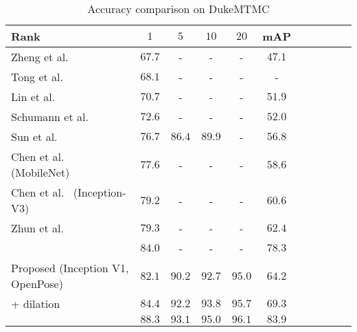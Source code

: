\documentclass{llncs}
\begin{document}
\begin{table}[t]
\setlength{\tabcolsep}{5pt}
\centering
\caption{\small Accuracy comparison on DukeMTMC}\vspace{-.3cm}
\label{table:result_duke}
\resizebox{0.70\linewidth}{!}
{
\begin{tabular}{|l| |Sc|Sc|Sc|Sc|Sc|}
\hline
Rank & $1$ & $5$ & $10$ & $20$ & mAP\\
\hline\hline
Zheng et al.~\cite{conf/iccv/zheng17} & $67.7$ & -& -& -& $47.1$\\
Tong et al.~\cite{conf/cvpr/xiao17} & $68.1$ & -& -& -& -\\
Lin et al.~\cite{journal/arxiv/lin17} & $70.7$ & -& -& -& $51.9$\\
Schumann et al.~\cite{conf/cvprw/schumann17} & $72.6$ & -& -& -& $52.0$\\
Sun et al.~\cite{conf/iccv/sun17} & $76.7$ & $86.4$ & $89.9$& -& $56.8$\\
Chen et al.~\cite{conf/cvpr/chen17} (MobileNet) & $77.6$ & -& -& -& $58.6$\\
Chen et al.~\cite{conf/cvpr/chen17} (Inception-V3) & $79.2$ & -& -& -& $60.6$\\
Zhun et al.~\cite{journal/arxiv/zhong17} & $79.3$ &- & -& -& $62.4$\\
\quad{} & {\color{blue} $84.0$} & {\color{blue} -}& {\color{blue} -} & {\color{blue} -} & {\color{blue} $78.3$}\\
\hline
Proposed (Inception V1, OpenPose)& $82.1$ & $90.2$ & $92.7$ & $95.0$ & $64.2$\\
\quad\quad + dilation& $\mathbf{84.4}$ & $\mathbf{92.2}$ & $\mathbf{93.8}$ & $\mathbf{95.7}$ & $\mathbf{69.3}$\\
\quad{} & {\color{blue}$\mathbf{88.3}$} & {\color{blue}$\mathbf{93.1}$} & {\color{blue}$\mathbf{95.0}$} & {\color{blue}$\mathbf{96.1}$} & {\color{blue}$\mathbf{83.9}$} \\
\hline
\end{tabular}}\vspace{-.3cm}
\end{table}
\end{document}
